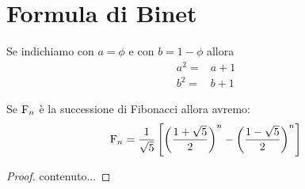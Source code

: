 \section{Formula di Binet}
\begin{lem}
	Se indichiamo con $a=\phi$ e con $b=1-\phi$
	allora
	\begin{align*}
		a^2=&a+1\\
		b^2=&b+1
	\end{align*}
\end{lem}
\begin{thm}
	Se $\operatorname{F}_{n}$ è la successione di Fibonacci allora avremo:
	\begin{equation}
		\operatorname{F}_{n}=\dfrac{1}{\sqrt{5}}\left[\left(\dfrac{1+\sqrt{5}}{2}\right)^n-\left(\dfrac{1-\sqrt{5}}{2}\right)^n\right]
	\end{equation}\label{eqn:FinBinet}
\end{thm}
\begin{proof}
	contenuto...
\end{proof}